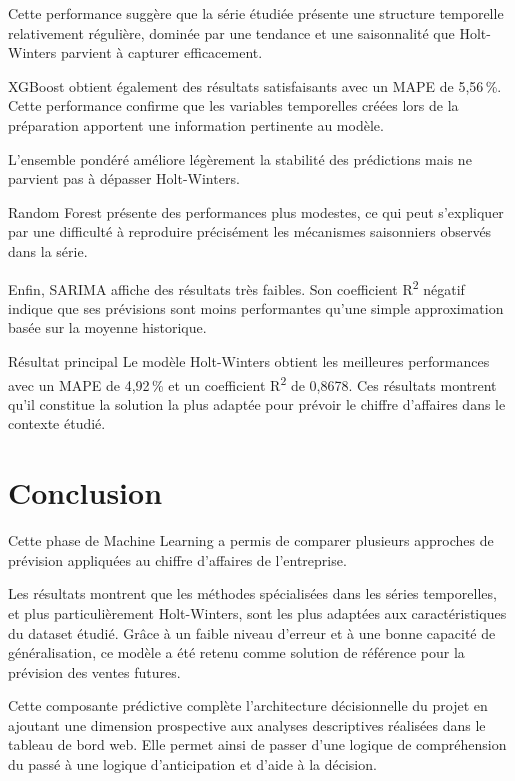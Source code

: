 \documentclass[12pt,a4paper,twoside]{report}
\begin{document}
Cette performance suggère que la série étudiée présente une structure temporelle relativement régulière, dominée par une tendance et une saisonnalité que Holt-Winters parvient à capturer efficacement.

XGBoost obtient également des résultats satisfaisants avec un MAPE de 5,56\,\%. Cette performance confirme que les variables temporelles créées lors de la préparation apportent une information pertinente au modèle.

L'ensemble pondéré améliore légèrement la stabilité des prédictions mais ne parvient pas à dépasser Holt-Winters.

Random Forest présente des performances plus modestes, ce qui peut s'expliquer par une difficulté à reproduire précisément les mécanismes saisonniers observés dans la série.

Enfin, SARIMA affiche des résultats très faibles. Son coefficient R\textsuperscript{2} négatif indique que ses prévisions sont moins performantes qu'une simple approximation basée sur la moyenne historique.

\begin{resultbox}{Résultat principal}
Le modèle Holt-Winters obtient les meilleures performances avec un MAPE de 4,92\,\% et un coefficient R\textsuperscript{2} de 0,8678. Ces résultats montrent qu'il constitue la solution la plus adaptée pour prévoir le chiffre d'affaires dans le contexte étudié.
\end{resultbox}

\section{Conclusion}

Cette phase de Machine Learning a permis de comparer plusieurs approches de prévision appliquées au chiffre d'affaires de l'entreprise.

Les résultats montrent que les méthodes spécialisées dans les séries temporelles, et plus particulièrement Holt-Winters, sont les plus adaptées aux caractéristiques du dataset étudié. Grâce à un faible niveau d'erreur et à une bonne capacité de généralisation, ce modèle a été retenu comme solution de référence pour la prévision des ventes futures.

Cette composante prédictive complète l'architecture décisionnelle du projet en ajoutant une dimension prospective aux analyses descriptives réalisées dans le tableau de bord web. Elle permet ainsi de passer d'une logique de compréhension du passé à une logique d'anticipation et d'aide à la décision.
\end{document}
